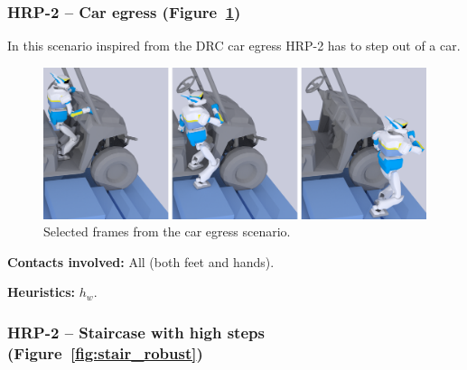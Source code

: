 \subsubsection{HRP-2 -- Car egress (Figure~\ref{fig:car})}
In this scenario inspired from the DRC car egress HRP-2 has to step out of a car.

\begin{figure}
  \centering
  \includegraphics[width=1\linewidth]{figures/polaris}
  \caption{
           Selected frames from the car egress scenario. }
		   \label{fig:car}
\end{figure}


\noindent\textbf{Contacts involved:} All (both feet and hands).

\noindent\textbf{Heuristics:} $h_w$.


\subsubsection{HRP-2 -- Staircase with high steps (Figure~\ref{fig:stair_robust})}
\newcommand{\widthValue}{0.13\linewidth}

